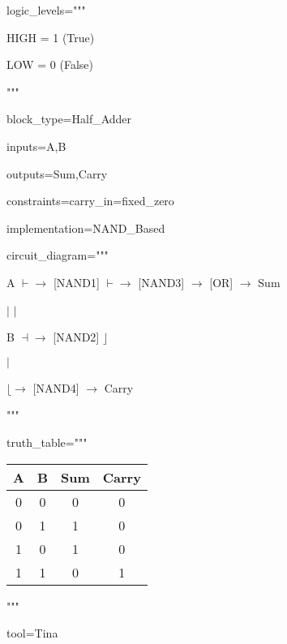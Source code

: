 \documentclass[11pt]{article}
\begin{document}
\noindent logic\_levels="""

\noindent HIGH = 1 (True)

\noindent LOW = 0 (False)

\noindent """

\vspace{0.5em}


\noindent block\_type=Half\_Adder

\noindent inputs=A,B

\noindent outputs=Sum,Carry

\noindent constraints=carry\_in=fixed\_zero

\noindent implementation=NAND\_Based

\vspace{0.5em}


\noindent circuit\_diagram="""

\noindent A \textemdash$\vdash$\textemdash$\rightarrow$ [NAND1] \textemdash$\vdash$\textemdash$\rightarrow$ [NAND3] \textemdash$\rightarrow$ [OR] \textemdash$\rightarrow$ Sum

\noindent    $|$              $|$

\noindent B \textemdash$\dashv$\textemdash$\rightarrow$ [NAND2] \textemdash$\rfloor$

\noindent    $|$

\noindent    $\lfloor$\textemdash$\rightarrow$ [NAND4] \textemdash$\rightarrow$ Carry

\noindent """

\vspace{0.5em}

\noindent truth\_table="""
\begin{tabular}{|c|c|c|c|}
\hline
A & B & Sum & Carry \\
\hline
0 & 0 & 0   & 0     \\
0 & 1 & 1   & 0     \\
1 & 0 & 1   & 0     \\
1 & 1 & 0   & 1     \\
\hline
\end{tabular}

\noindent """

\vspace{0.5em}


\noindent tool=Tina
\end{document}

